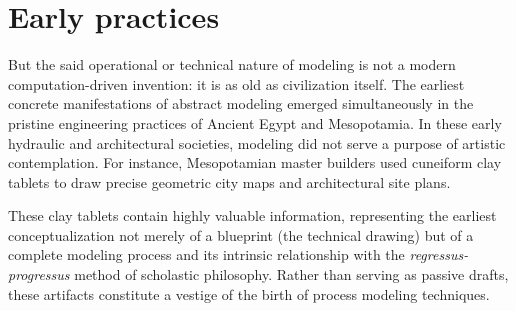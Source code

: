 \documentclass[11pt, a4paper]{article}
\begin{document}
\section{Early practices}

But the said operational or technical nature of modeling is not a modern computation-driven invention: it is as old as civilization itself. The earliest concrete manifestations of abstract modeling emerged simultaneously in the pristine engineering practices of \textrm{Ancient Egypt} and \textrm{Mesopotamia}. In these early hydraulic and architectural societies, modeling did not serve a purpose of artistic contemplation. For instance, Mesopotamian master builders used cuneiform clay tablets to draw precise geometric city maps and architectural site plans.

These clay tablets contain highly valuable information, representing the earliest conceptualization not merely of a blueprint (the technical drawing) but of a complete modeling process and its intrinsic relationship with the \textit{regressus-progressus} method of scholastic philosophy. Rather than serving as passive drafts, these artifacts constitute a vestige of the birth of process modeling techniques.

\newcommand{\cuniHorizontal}{%
	\begin{tikzpicture}[scale=0.15, baseline=-0.2ex, rotate=-90]
		\fill (0,0) -- (-0.6,-1.2) -- (-0.1,-1.2) -- (-0.1,-4) -- (0.1,-4) -- (0.1,-1.2) -- (0.6,-1.2) -- cycle;
	\end{tikzpicture}%
}
\newcommand{\cuniVertical}{%
	\begin{tikzpicture}[scale=0.15, baseline=-1.2ex]
		\fill (0,0) -- (-0.6,-1.2) -- (-0.1,-1.2) -- (-0.1,-4) -- (0.1,-4) -- (0.1,-1.2) -- (0.6,-1.2) -- cycle;
	\end{tikzpicture}%
}
\newcommand{\cuniDiagDown}{%
	\begin{tikzpicture}[scale=0.15, baseline=1ex, rotate=135]
		\fill (0,0) -- (-0.6,-1.2) -- (-0.1,-1.2) -- (-0.1,-4) -- (0.1,-4) -- (0.1,-1.2) -- (0.6,-1.2) -- cycle;
	\end{tikzpicture}%
}
\newcommand{\cuniDiagUp}{%
	\begin{tikzpicture}[scale=0.15, baseline=-2ex, rotate=45]
		\fill (0,0) -- (-0.6,-1.2) -- (-0.1,-1.2) -- (-0.1,-4) -- (0.1,-4) -- (0.1,-1.2) -- (0.6,-1.2) -- cycle;
	\end{tikzpicture}%
}
\newcommand{\cuniWinkel}{%
	\begin{tikzpicture}[scale=0.15, baseline=-0.4ex]
		\fill (0,0) -- (1.44,0.84) -- (0.96,0) -- (1.44,-0.84) -- cycle;
	\end{tikzpicture}%
}
\end{document}
